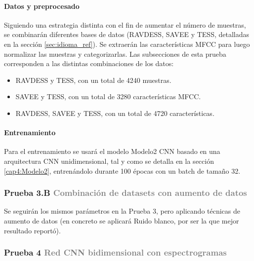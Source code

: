 \documentclass[11pt,a4paper,spanish]{book}
\begin{document}
	\hfill\begin{minipage}{\dimexpr\textwidth-1cm}

		\paragraph{Datos y preprocesado} Siguiendo una estrategia distinta con el fin de aumentar el número de muestras, se combinarán diferentes bases de datos (RAVDESS, SAVEE y TESS, detalladas en la sección \ref{sec:idioma_ref}). Se extraerán las características MFCC para luego normalizar las muestras y categorizarlas.
		Las subsecciones de esta prueba corresponden a las distintas combinaciones de los datos:
		\begin{itemize}
			\item RAVDESS y TESS, con un total de 4240 muestras.
			\item SAVEE y TESS, con un total de 3280 características MFCC.
			\item RAVDESS, SAVEE y TESS, con un total de 4720 características.
		\end{itemize}
	
		\paragraph{Entrenamiento} Para el entrenamiento se usará el modelo Modelo2 CNN basado en una arquitectura CNN unidimensional, tal y como se detalla en la sección \ref{cap4:Modelo2}, entrenándolo durante 100 épocas con un batch de tamaño 32.
	\end{minipage}

	\subsubsection[]{\large Prueba 3.B {\normalsize \textcolor{Gray}{Combinación de datasets con aumento de datos}}}
	Se seguirán los mismos parámetros en la Prueba 3, pero aplicando técnicas de aumento de datos (en concreto se aplicará Ruido blanco, por ser la que mejor resultado reportó).
	
	\subsubsection{\large Prueba 4 {\normalsize \textcolor{Gray}{Red CNN bidimensional con espectrogramas}}}
	
\end{document}
